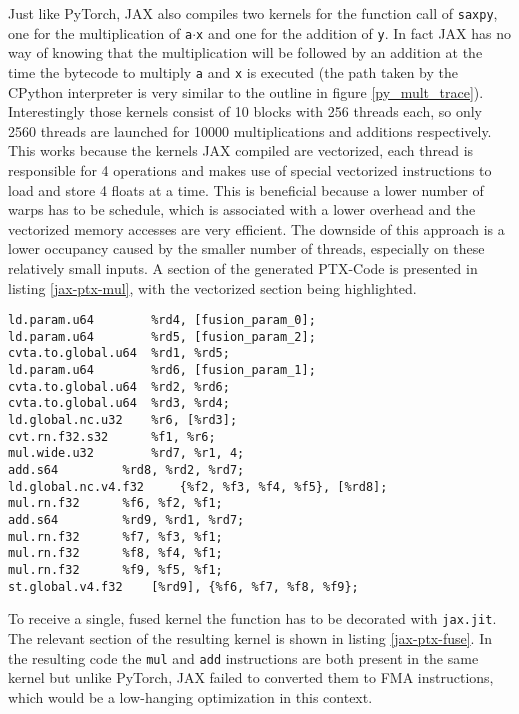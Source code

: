 \documentclass[english,11pt,a4paper,table]{article} %
\begin{document}
Just like PyTorch, JAX also compiles two kernels for the function call of \texttt{saxpy}, one for the multiplication of \texttt{a$\cdot$x} and one for the addition of \texttt{y}.
In fact JAX has no way of knowing that the multiplication will be followed by an addition at the time the bytecode to multiply \texttt{a} and \texttt{x} is executed (the path taken by the CPython interpreter is very similar to the outline in figure \ref{py_mult_trace}).
Interestingly those kernels consist of 10 blocks with 256 threads each, so only 2560 threads are launched for 10000 multiplications and additions respectively.
This works because the kernels JAX compiled are vectorized, each thread is responsible for 4 operations and makes use of special vectorized instructions to load and store 4 floats at a time. This is beneficial because a lower number of warps has to be schedule, which is associated with a lower overhead and the vectorized memory accesses are very efficient. 
The downside of this approach is a lower occupancy caused by the smaller number of threads, especially on these relatively small inputs.
A section of the generated PTX-Code is presented in listing \ref{jax-ptx-mul}, with the vectorized section being highlighted.

\begin{verbatim}
ld.param.u64 		%rd4, [fusion_param_0];
ld.param.u64 		%rd5, [fusion_param_2];
cvta.to.global.u64 	%rd1, %rd5;
ld.param.u64 		%rd6, [fusion_param_1];
cvta.to.global.u64	%rd2, %rd6;
cvta.to.global.u64 	%rd3, %rd4;
ld.global.nc.u32 	%r6, [%rd3];
cvt.rn.f32.s32 		%f1, %r6;
mul.wide.u32 		%rd7, %r1, 4;
add.s64 		%rd8, %rd2, %rd7;
ld.global.nc.v4.f32 	{%f2, %f3, %f4, %f5}, [%rd8];
mul.rn.f32 		%f6, %f2, %f1;
add.s64 		%rd9, %rd1, %rd7;
mul.rn.f32 		%f7, %f3, %f1;
mul.rn.f32 		%f8, %f4, %f1;
mul.rn.f32 		%f9, %f5, %f1;
st.global.v4.f32 	[%rd9], {%f6, %f7, %f8, %f9};
\end{verbatim}

To receive a single, fused kernel the function has to be decorated with \texttt{jax.jit}.
The relevant section of the resulting kernel is shown in listing \ref{jax-ptx-fuse}. In the resulting code the \texttt{mul} and \texttt{add} instructions are both present in the same kernel but unlike PyTorch, JAX failed to converted them to FMA instructions, which would be a low-hanging optimization in this context.
\end{document}
